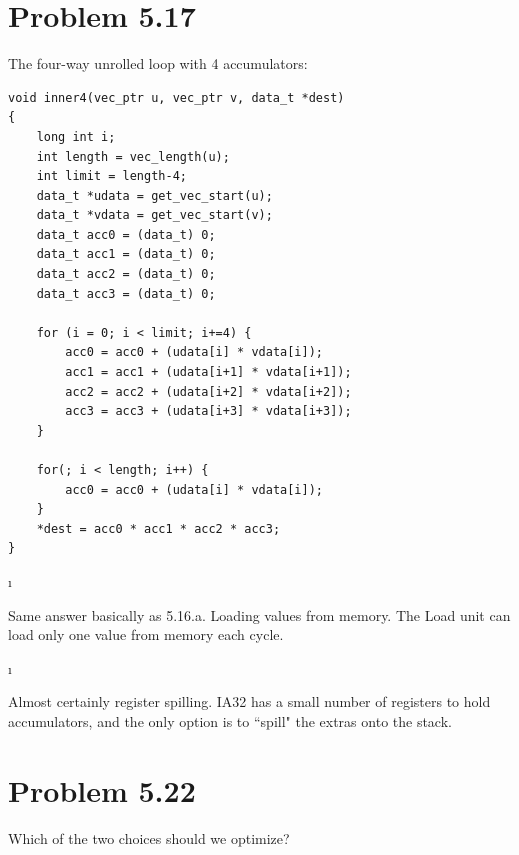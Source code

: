 \documentclass[fleqn]{article}
\begin{document}
\ene

\section{Problem 5.17}

The four-way unrolled loop with 4 accumulators:

\begin{solution}
\begin{verbatim}
void inner4(vec_ptr u, vec_ptr v, data_t *dest)
{
    long int i;
    int length = vec_length(u);
    int limit = length-4;
    data_t *udata = get_vec_start(u);
    data_t *vdata = get_vec_start(v);
    data_t acc0 = (data_t) 0;
    data_t acc1 = (data_t) 0;
    data_t acc2 = (data_t) 0;
    data_t acc3 = (data_t) 0;
    
    for (i = 0; i < limit; i+=4) {
        acc0 = acc0 + (udata[i] * vdata[i]);
        acc1 = acc1 + (udata[i+1] * vdata[i+1]);
        acc2 = acc2 + (udata[i+2] * vdata[i+2]);
        acc3 = acc3 + (udata[i+3] * vdata[i+3]);
    }
    
    for(; i < length; i++) {
        acc0 = acc0 + (udata[i] * vdata[i]);
    }
    *dest = acc0 * acc1 * acc2 * acc3;
}
\end{verbatim}
\end{solution}

\bee

\i
\begin{solution}
Same answer basically as 5.16.a. Loading values from memory. The Load unit can load only one value from memory each cycle.
\end{solution}

\i
\begin{solution}
Almost certainly register spilling. IA32 has a small number of registers to hold accumulators, and the only option is to ``spill" the extras onto the stack.
\end{solution}

\ene

\section{Problem 5.22}

Which of the two choices should we optimize?
\end{document}
